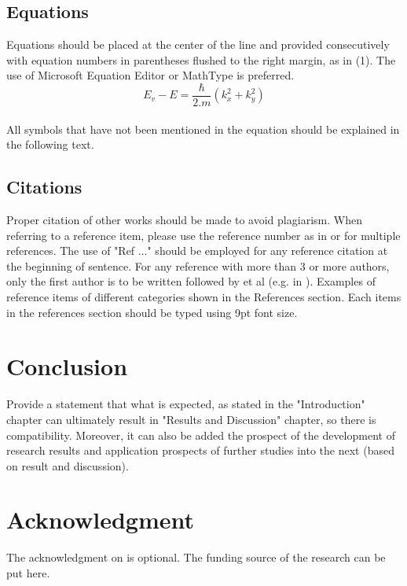 \documentclass{iaesarticle3}
\begin{document}
\subsection{Equations}
Equations should be placed at the center of the line and provided consecutively with equation numbers in parentheses flushed to the right margin, as in (1). The use of Microsoft Equation Editor or MathType is preferred.
\\
\begin{equation}
E_v - E = \frac{\hbar}{2.m}(k_x^2 + k_y^2)
\end{equation}
\\
All symbols that have not been mentioned in the equation should be explained in the following text.

\subsection{Citations}
Proper citation of other works should be made to avoid plagiarism. When referring to a reference item, please use the reference number as in \cite{Li} or \cite{Li, Arulmozhiyal, Zhang, Yinhai, lamport, knuth} for multiple references. The use of "Ref \cite{lamport}..." should be employed for any reference citation at the beginning of sentence. For any reference with more than 3 or more authors, only the first author is to be written followed by et al (e.g. in \cite{Yinhai}).  Examples of reference items of different categories shown in the References section. Each items in the references section should be typed using 9pt font size.

\section{Conclusion}
\label{}
Provide a statement that what is expected, as stated in the "Introduction" chapter can ultimately result in "Results and Discussion" chapter, so there is compatibility. Moreover, it can also be added the prospect of the development of research results and application prospects of further studies into the next (based on result and discussion).

\section*{Acknowledgment}
\label{}
The acknowledgment on is optional. The funding source of the research can be put here.

\end{document}
